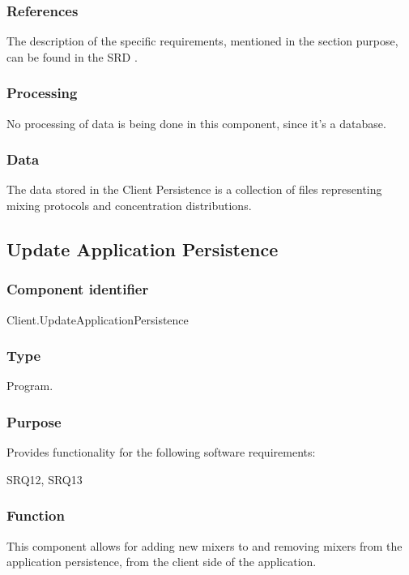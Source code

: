 \subsubsection*{References}
The description of the specific requirements, mentioned in the section purpose, can be found in the SRD \cite{srd}.

\subsubsection*{Processing}
No processing of data is being done in this component, since it's a database.

\subsubsection*{Data}
The data stored in the Client Persistence is a collection of files representing mixing protocols and concentration distributions.

\subsection{Update Application Persistence}

\subsubsection*{Component identifier}
Client.UpdateApplicationPersistence

\subsubsection*{Type}
Program.

\subsubsection*{Purpose}
Provides functionality for the following software requirements:

\noindent SRQ12, SRQ13

\subsubsection*{Function}
This component allows for adding new mixers to and removing mixers from the application persistence, from the client side of the application.

